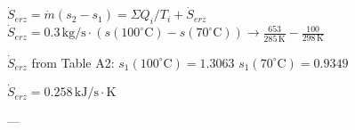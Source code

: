 \( \dot{S}_{erz} = \dot{m} (s_2 - s_1) = \Sigma Q_i / T_i + \dot{S}_{erz} \)  
\( \dot{S}_{erz} = 0.3 \, \text{kg/s} \cdot (s(100^\circ \text{C}) - s(70^\circ \text{C})) \rightarrow \frac{653}{285 \, \text{K}} - \frac{100}{298 \, \text{K}} \)  

\( \dot{S}_{erz} \) from Table A2:  
\( s_1 (100^\circ \text{C}) = 1.3063 \)  
\( s_1 (70^\circ \text{C}) = 0.9349 \)  

\( \dot{S}_{erz} = 0.258 \, \text{kJ/s} \cdot \text{K} \)  

---